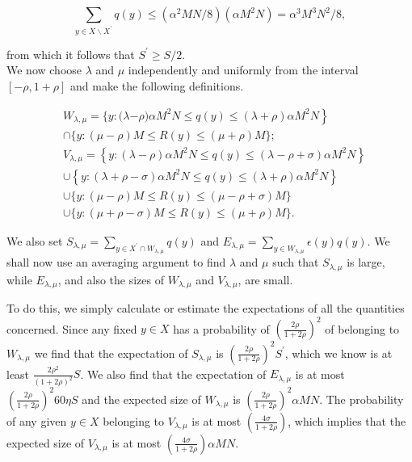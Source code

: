 \documentclass[10pt]{article}
\begin{document}
$$
\sum_{y \in X \backslash X^{\prime}} q(y) \leqslant\left(\alpha^{2} M N / 8\right)\left(\alpha M^{2} N\right)=\alpha^{3} M^{3} N^{2} / 8,
$$

from which it follows that $S^{\prime} \geqslant S / 2$.\\
We now choose $\lambda$ and $\mu$ independently and uniformly from the interval $[-\rho, 1+\rho]$ and make the following definitions.

$$
\begin{aligned}
& W_{\lambda, \mu}=\{y:(\lambda\left.-\rho) \alpha M^{2} N \leqslant q(y) \leqslant(\lambda+\rho) \alpha M^{2} N\right\} \\
& \cap\{y:(\mu-\rho) M \leqslant R(y) \leqslant(\mu+\rho) M\} ; \\
& V_{\lambda, \mu}=\left\{y:(\lambda-\rho) \alpha M^{2} N \leqslant q(y) \leqslant(\lambda-\rho+\sigma) \alpha M^{2} N\right\} \\
& \cup\left\{y:(\lambda+\rho-\sigma) \alpha M^{2} N \leqslant q(y) \leqslant(\lambda+\rho) \alpha M^{2} N\right\} \\
& \cup\{y:(\mu-\rho) M \leqslant R(y) \leqslant(\mu-\rho+\sigma) M\} \\
& \cup\{y:(\mu+\rho-\sigma) M \leqslant R(y) \leqslant(\mu+\rho) M\} .
\end{aligned}
$$

We also set $S_{\lambda, \mu}=\sum_{y \in X^{\prime} \cap W_{\lambda, \mu}} q(y)$ and $E_{\lambda, \mu}=\sum_{y \in W_{\lambda, \mu}} \epsilon(y) q(y)$. We shall now use an averaging argument to find $\lambda$ and $\mu$ such that $S_{\lambda, \mu}$ is large, while $E_{\lambda, \mu}$, and also the sizes of $W_{\lambda, \mu}$ and $V_{\lambda, \mu}$, are small.

To do this, we simply calculate or estimate the expectations of all the quantities concerned. Since any fixed $y \in X$ has a probability of $\left(\frac{2 \rho}{1+2 \rho}\right)^{2}$ of belonging to $W_{\lambda, \mu}$ we find that the expectation of $S_{\lambda, \mu}$ is $\left(\frac{2 \rho}{1+2 \rho}\right)^{2} S^{\prime}$, which we know is at least $\frac{2 \rho^{2}}{(1+2 \rho)^{2}} S$. We also find that the expectation of $E_{\lambda, \mu}$ is at most $\left(\frac{2 \rho}{1+2 \rho}\right)^{2} 60 \eta S$ and the expected size of $W_{\lambda, \mu}$ is $\left(\frac{2 \rho}{1+2 \rho}\right)^{2} \alpha M N$. The probability of any given $y \in X$ belonging to $V_{\lambda, \mu}$ is at most $\left(\frac{4 \sigma}{1+2 \rho}\right)$, which implies that the expected size of $V_{\lambda, \mu}$ is at most $\left(\frac{4 \sigma}{1+2 \rho}\right) \alpha M N$.
\end{document}
